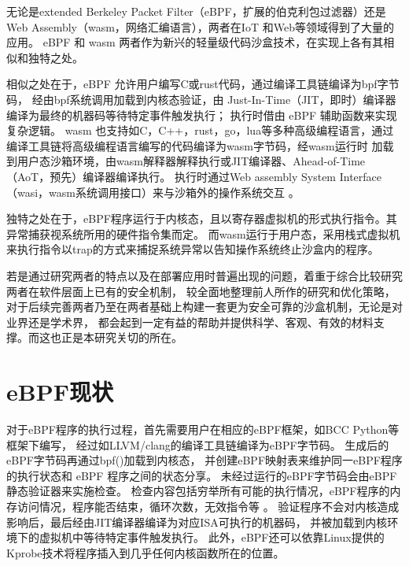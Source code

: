 \documentclass[12pt,a4paper,dvipdfmx]{article}
\begin{document}
	\begin{sloppypar} %
	\begin{CJK*}{UTF8}{song}
	无论是extended Berkeley Packet Filter（eBPF，扩展的伯克利包过滤器）还是Web Assembly（wasm，网络汇编语言），两者在IoT
	\cite{zhangResearchWebAssemblyRuntimes2024}和Web\cite{9110434, TCPdump, 10.1145/3371038}等领域得到了大量的应用。
	eBPF 和 wasm 两者作为新兴的轻量级代码沙盒技术，在实现上各有其相似和独特之处。

	相似之处在于，eBPF 允许用户编写C或rust代码，通过编译工具链编译为bpf字节码，
	经由bpf系统调用加载到内核态验证，由 Just-In-Time（JIT，即时）编译器编译为最终的机器码等待特定事件触发执行\cite{FuzzOnEBPF}；
	执行时借由 eBPF 辅助函数来实现复杂逻辑\cite{riceLearningEBPFProgramming2023}。
	wasm 也支持如C，C++，rust，go，lua等多种高级编程语言，通过编译工具链将高级编程语言编写的代码编译为wasm字节码，经wasm运行时
	加载到用户态沙箱环境，由wasm解释器解释执行或JIT编译器、Ahead-of-Time（AoT，预先）编译器编译执行\cite[6]{zhangResearchWebAssemblyRuntimes2024}。
	执行时通过Web assembly System Interface（wasi，wasm系统调用接口）来与沙箱外的操作系统交互
	\cite{zhangResearchWebAssemblyRuntimes2024, zhangCharacterizingDetectingWebAssembly2024}。

	独特之处在于，eBPF程序运行于内核态，且以寄存器虚拟机的形式执行指令。其异常捕获视系统所用的硬件指令集而定。
	而wasm运行于用户态，采用栈式虚拟机来执行指令以trap的方式来捕捉系统异常以告知操作系统终止沙盒内的程序\cite{groupWebAssemblySpecification2024}。

	若是通过研究两者的特点以及在部署应用时普遍出现的问题，着重于综合比较研究两者在软件层面上已有的安全机制，
	较全面地整理前人所作的研究和优化策略，对于后续完善两者乃至在两者基础上构建一套更为安全可靠的沙盒机制，无论是对业界还是学术界，
	都会起到一定有益的帮助并提供科学、客观、有效的材料支撑。而这也正是本研究关切的所在。

	\section{eBPF现状}
	对于eBPF程序的执行过程，首先需要用户在相应的eBPF框架，如BCC Python等框架下编写，
	经过如LLVM/clang的编译工具链编译为eBPF字节码\cite{riceLearningEBPFProgramming2023}。
	生成后的eBPF字节码再通过bpf()加载到内核态\cite{riceLearningEBPFProgramming2023}，
	并创建eBPF映射表来维护同一eBPF程序的执行状态和 eBPF 程序之间的状态分享\cite[2]{bensonNetEditOrchestrationPlatform2024}。
	未经过运行的eBPF字节码会由eBPF静态验证器来实施检查\cite{zhengBpftimeUserspaceEBPF2023, HaoValidating}。
	检查内容包括穷举所有可能的执行情况，eBPF程序的内存访问情况，程序能否结束，循环次数，无效指令等
	\cite{286467, riceLearningEBPFProgramming2023}。
	验证程序不会对内核造成影响后，最后经由JIT编译器编译为对应ISA可执行的机器码\cite{FuzzOnEBPF}，
	并被加载到内核环境下的虚拟机中等待特定事件触发执行\cite{maoMerlinMultitierOptimization2024}。
	此外，eBPF还可以依靠Linux提供的Kprobe技术将程序插入到几乎任何内核函数所在的位置\cite{riceLearningEBPFProgramming2023}。


\end{CJK*}
\end{sloppypar}
\end{document}
